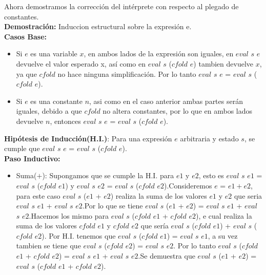 \documentclass{article}
\begin{document}
\begin{itemize}
\begin{itemize}
\begin{lstlisting}[language=Haskell]
                \end{lstlisting}    
                Ahora demostramos la corrección del intérprete con respecto al plegado de constantes.\\

                \textbf{Demostración:} Induccion estructural sobre la expresión e.\\
                
                \textbf{Casos Base:}
                \begin{itemize}
                \item Si $e$ es una variable $x$, en ambos lados de la expresión son iguales, en $eval$ $s$ $e$ devuelve el valor esperado x, así como en $eval$ $s$ ($cfold$ $e$) tambien devuelve $x$, ya que $cfold$ no hace ninguna simplificación. Por lo tanto $eval$ $s$ $e$ = $eval$ $s$ ($cfold$ $e$).\\

                \item Si $e$ es una constante $n$, asi como en el caso anterior ambas partes serán iguales, debido a que $cfold$ no altera constantes, por lo que en ambos lados devuelve $n$, entonces $eval$ $s$ $e$ = $eval$ $s$ ($cfold$ $e$).\\
                \end{itemize}

                \textbf{Hipótesis de Inducción(H.I.)}: Para una expresión $e$ arbitraria y estado $s$, se cumple que $eval$ $s$ $e$ = $eval$ $s$ ($cfold$ $e$).\\

                \textbf{Paso Inductivo:}
                \begin{itemize}
                    \item Suma($+$): Supongamos que se cumple la H.I. para $e1$ y $e2$, esto es $eval$ $s$ $e1$ = $eval$ $s$ ($cfold$ $e1$) y $eval$ $s$ $e2$ = $eval$ $s$ ($cfold$ $e2$).Consideremos $e$ = $e1 + e2$, para este caso $eval$ $s$ ($e1$ + $e2$) realiza la suma de los valores $e1$ y $e2$ que seria $eval$ $s$ $e1$ + $eval$ $s$ $e2$.Por lo que se tiene $eval$ $s$ ($e1$ + $e2$) = $eval$ $s$ $e1$ + $eval$ $s$ $e2$.Hacemos los mismo para $eval$ $s$ ($cfold$ $e1$ + $cfold$ $e2$), e cual realiza la suma de los valores $cfold$ $e1$ y $cfold$ $e2$ que sería $eval$ $s$ ($cfold$ $e1$) + $eval$ $s$ ($cfold$ $e2$). Por H.I. tenemos que $eval$ $s$ ($cfold$ $e1$) = $eval$ $s$ $e1$, a su vez tambien se tiene que $eval$ $s$ ($cfold$ $e2$) = $eval$ $s$ $e2$. Por lo tanto $eval$ $s$ ($cfold$ $e1$ + $cfold$ $e2$) = $eval$ $s$ $e1$ + $eval$ $s$ $e2$.Se demuestra que $eval$ $s$ ($e1$ + $e2$) = $eval$ $s$ ($cfold$ $e1$ + $cfold$ $e2$).\\


\end{itemize}
\end{itemize}
\end{itemize}
\end{document}
